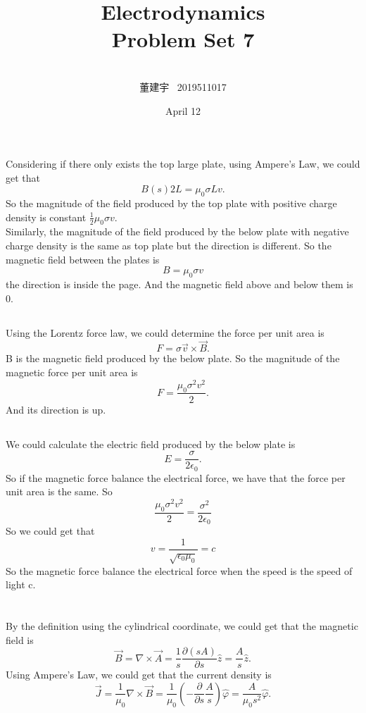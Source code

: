 \documentclass[10.5pt]{article}
\title{Electrodynamics \\Problem Set 7\\}
\author{\\董建宇 ~2019511017}
\date{April 12}
\begin{document}
    
\maketitle
\newpage

\section{}
\subsection{}
Considering if there only exists the top large plate, using Ampere's Law, we could get that $$B(s)2L=\mu_0\sigma Lv.$$\indent
So the magnitude of the field produced by the top plate with positive charge density is constant $\frac{1}{2}\mu_0\sigma v$.\\\indent
Similarly, the magnitude of the field produced by the below plate with negative charge density is the same as top plate but the direction is different. So the magnetic field between the plates is $$B=\mu_0\sigma v$$\indent
the direction is inside the page. And the magnetic field above and below them is 0.
\subsection{}
Using the Lorentz force law, we could determine the force per unit area is $$F=\sigma \vec{v}\times \vec{B}.$$\indent
B is the magnetic field produced by the below plate. So the magnitude of the magnetic force per unit area is $$F=\frac{\mu_0\sigma^2v^2}{2}.$$\indent
And its direction is up.
\subsection{}
We could calculate the electric field produced by the below plate is $$E=\frac{\sigma}{2\epsilon_0}.$$\indent
So if the magnetic force balance the electrical force, we have that the force per unit area is the same. So $$\frac{\mu_0\sigma^2v^2}{2}=\frac{\sigma^2}{2\epsilon_0}$$\indent
So we could get that $$v=\frac{1}{\sqrt{\epsilon_0\mu_0}}=c$$\indent
So the magnetic force balance the electrical force when the speed is the speed of light c.

\section{}
By the definition using the cylindrical coordinate, we could get that the magnetic field is $$\vec{B}=\nabla\times\vec{A}=\frac{1}{s}\frac{\partial (sA)}{\partial s}\hat{z}=\frac{A}{s}\hat{z}.$$\indent
Using Ampere's Law, we could get that the current density is $$\vec{J}=\frac{1}{\mu_0}\nabla\times\vec{B}=\frac{1}{\mu_0}\left(-\frac{\partial}{\partial s}\frac{A}{s}\right)\hat{\varphi}=\frac{A}{\mu_0s^2}\hat{\varphi}.$$\indent
\end{document}
